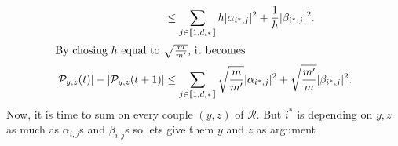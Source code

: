 \begin{appendix}
\begin{tproof}
\begin{align*}
                                                                                & \leq \sum_{j\in\llbracket1,d_{i^*}\rrbracket} h\vert\alpha_{i^*,j}\vert^2 + \frac{1}{h}\vert\beta_{i^*,j}\vert^2.                           \\
            \intertext{By chosing $h$ equal to $\sqrt{\frac{m}{m'}}$, it becomes}
            \vert \mathcal{P}_{y,z}(t)\vert - \vert \mathcal{P}_{y,z}(t+1)\vert & \leq \sum_{j\in\llbracket1,d_{i^*}\rrbracket} \sqrt{\frac{m}{m'}}\vert\alpha_{i^*,j}\vert^2 + \sqrt{\frac{m'}{m}}\vert\beta_{i^*,j}\vert^2. \\
        \end{align*}
        Now, it is time to sum on every couple $(y,z)$ of $\mathcal{R}$. But $i^*$ is depending on $y,z$ as much
        as $\alpha_{i,j}$s and $\beta_{i,j}$s so lets give them $y$ and $z$ as argument


\end{tproof}
\end{appendix}
